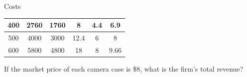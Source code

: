 \documentclass{beamer}
\begin{document}
\begin{frame}[t]{Costs}
\begin{table}[H]
\begin{tabular}{cccccc}
    400      & 2760                                                  & 1760                                                    & 8                                                        & 4.4                                                              & 6.9                                                           \\ \hline
    500      & 4000                                                  & 3000                                                    & 12.4                                                     & 6                                                                & 8                                                             \\ \hline
    600      & 5800                                                  & 4800                                                    & 18                                                       & 8                                                                & 9.66                                                         
    \end{tabular}
    \end{table}
    If the market price of each camera case is \$8, what is the firm's total revenue?
\end{frame}
\end{document}
